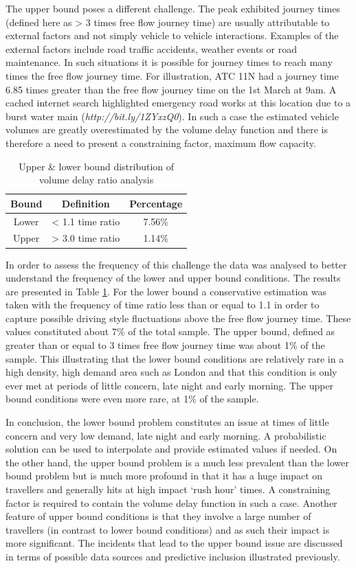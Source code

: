\documentclass{CUP-JNL-DCE}
\begin{document}
The upper bound poses a different challenge. The peak exhibited journey times (defined here as > 3 times free flow journey time) are usually attributable to external factors and not simply vehicle to vehicle interactions. Examples of the external factors include road traffic accidents, weather events or road maintenance. In such situations it is possible for journey times to reach many times the free flow journey time. For illustration, ATC 11N had a journey time 6.85 times greater than the free flow journey time on the 1st March at 9am. A cached internet search highlighted emergency road works at this location due to a burst water main (\textit{http://bit.ly/1ZYxzQ0}). In such a case the estimated vehicle volumes are greatly overestimated by the volume delay function and there is therefore a need to present a constraining factor, maximum flow capacity. 

\begin{table}[h!]
	\centering
	\caption{Upper \& lower bound distribution of volume delay ratio analysis}
	\label{tab:table3.8}
	\begin{tabular}{ccc}
		\toprule
		Bound & Definition & Percentage \\
		\midrule
		Lower & < 1.1 time ratio & 7.56\% \\
		Upper & > 3.0 time ratio & 1.14\% \\
		\bottomrule
	\end{tabular}
\end{table}

In order to assess the frequency of this challenge the data was analysed to better understand the frequency of the lower and upper bound conditions. The results are presented in Table \ref{tab:table3.8}. For the lower bound a conservative estimation was taken with the frequency of time ratio less than or equal to 1.1 in order to capture possible driving style fluctuations above the free flow journey time. These values constituted about 7\% of the total sample. The upper bound, defined as greater than or equal to 3 times free flow journey time was about 1\% of the sample. This illustrating that the lower bound conditions are relatively rare in a high density, high demand area such as London and that this condition is only ever met at periods of little concern, late night and early morning. The upper bound conditions were even more rare, at 1\% of the sample.

In conclusion, the lower bound problem constitutes an issue at times of little concern and very low demand, late night and early morning. A probabilistic solution can be used to interpolate and provide estimated values if needed. On the other hand, the upper bound problem is a much less prevalent than the lower bound problem but is much more profound in that it has a huge impact on travellers and generally hits at high impact ‘rush hour’ times. A constraining factor is required to contain the volume delay function in such a case. Another feature of upper bound conditions is that they involve a large number of travellers (in contrast to lower bound conditions) and as such their impact is more significant. The incidents that lead to the upper bound issue are discussed in terms of possible data sources and predictive inclusion illustrated previously.
\end{document}
